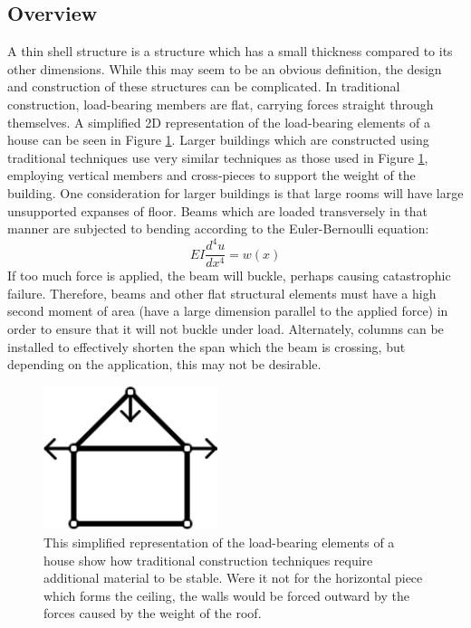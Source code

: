 \documentclass{thesis}
\begin{document}
\subsection{Overview}
A thin shell structure is a structure which has a small thickness compared to its other dimensions.  While this may seem to be
an obvious definition, the design and construction of these structures can be complicated.  In traditional construction, load-bearing
members are flat, carrying forces straight through themselves.  A simplified 2D representation of the load-bearing elements of a house
can be seen in Figure \ref{fig:house}.  Larger buildings which are constructed using traditional techniques use very similar techniques
as those used in Figure \ref{fig:house}, employing vertical members and cross-pieces to support the weight of the building.  One
consideration for larger buildings is that large rooms will have large unsupported expanses of floor.  Beams which are loaded transversely
in that manner are subjected to bending according to the Euler-Bernoulli equation: \[EI\frac{d^4u}{dx^4}=w(x)\]
If too much force is applied, the beam will buckle, perhaps causing catastrophic failure.  Therefore, beams and other flat structural
elements must have a high second moment of area (have a large dimension parallel to the applied force) in order to ensure that it will not
buckle under load.  Alternately, columns can be installed to effectively shorten the span which the beam is crossing, but depending on the
application, this may not be desirable.

\begin{figure}
\centering
\includegraphics[width=2in]{images/house.png}
\caption[Simplified representation of a house]{This simplified representation of the load-bearing elements of a house show how traditional
construction techniques require additional material to be stable.  Were it not for the horizontal piece which forms the ceiling, the walls
would be forced outward by the forces caused by the weight of the roof.}
\label{fig:house}
\end{figure}
\end{document}
